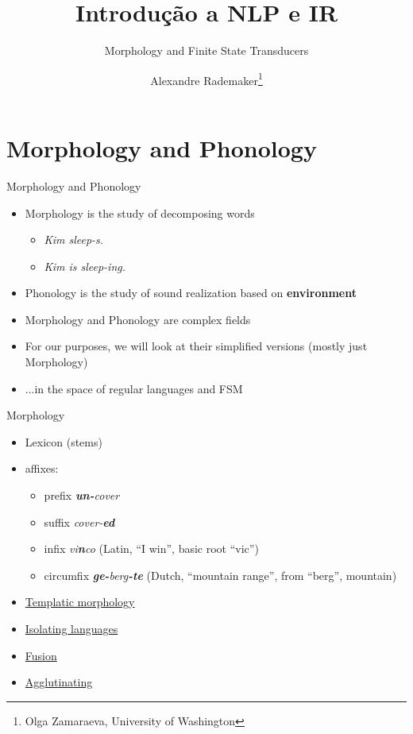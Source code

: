 \documentclass{beamer}
\title{Introdução a NLP e IR}
\author{Alexandre Rademaker\thanks{Olga Zamaraeva, University of Washington}}
\institute{FGV/EMAp}
\subtitle{Morphology and Finite State Transducers}
\begin{document}
\begin{frame}
  \maketitle
\end{frame}


\section{Morphology and Phonology}

\begin{frame}{Morphology and Phonology}

  \begin{itemize}
  \item Morphology is the study of decomposing words
    \begin{itemize}
    \item {\it Kim sleep-s.}
    \item {\it Kim is sleep-ing.}
    \end{itemize}
  \item Phonology is the study of sound realization based on {\bf environment}
  \item Morphology and Phonology are complex fields
  \item For our purposes, we will look at their simplified versions (mostly just Morphology)
  \item ...in the space of regular languages and FSM
  \end{itemize}
\end{frame}


\begin{frame}{Morphology}
  \begin{itemize}
  \item Lexicon (stems)
  \item affixes:
    \begin{itemize}
    \item prefix {\it {\bf un-}cover}
    \item suffix {\it cover-{\bf ed}}
    \item infix {\it vi{\bf n}co} (Latin, ``I win'', basic root ``vic'')
    \item circumfix {\it {\bf ge-}berg{\bf -te}} (Dutch, ``mountain range'', from ``berg'', mountain)
    \end{itemize}
  \item \href{https://en.wikipedia.org/wiki/Nonconcatenative_morphology}{Templatic morphology}
  \item \href{https://en.wikipedia.org/wiki/Isolating_language}{Isolating languages}
  \item \href{https://en.wikipedia.org/wiki/Fusional_language}{Fusion}
  \item \href{https://en.wikipedia.org/wiki/Agglutinative_language}{Agglutinating}
  \end{itemize}
\end{frame}
\end{document}
